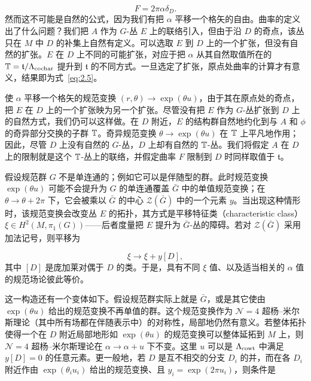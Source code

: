 \setcounter{equation}{4}
\begin{equation}\label{eq:2.5}
  F=2\pi\alpha \delta_D.
\end{equation}
 然而这不可能是自然的公式，因为我们有把 $\alpha$ 平移一个格矢的自由。曲率的定义出了什么问题？我们把 $A$ 作为 $G$-丛 $E$ 上的联络引入，但由于沿 $D$ 的奇点，该丛只在 $M$ 中 $D$ 的补集上自然有定义。可以选取 $E$ 到 $D$ 上的一个扩张，但没有自然的扩张。$E$ 在 $D$ 上不同的可能扩张，对应于把 $\alpha$ 从其自然取值所在的 ${\mathbb{T}}={\mathfrak t}/\Lambda_{\rm cochar}$ 提升到 $\mathfrak t$ 的不同方式。一旦选定了扩张，原点处曲率的计算才有意义，结果即为式~\eqref{eq:2.5}。

使 $\alpha$ 平移一个格矢的规范变换 $(r,\theta)\to \exp(\theta u)$，由于其在原点处的奇点，把 $E$ 在 $D$ 上的一个扩张映为另一个扩张。尽管没有把 $E$ 作为 $G$-丛扩张到 $D$ 上的自然方式，我们仍可以这样做。在 $D$ 附近，$E$ 的结构群自然地约化到与 $A$ 和 $\phi$ 的奇异部分交换的子群 ${\mathbb{T}}$。奇异规范变换 $\theta\to \exp(\theta u)$ 在 ${\mathbb{T}}$ 上平凡地作用；因此，尽管 $D$ 上没有自然的 $G$-丛，$D$ 上却有自然的 ${\mathbb{T}}$-丛。我们将假定 $A$ 在 $D$ 上的限制就是这个 ${\mathbb{T}}$-丛上的联络，并假定曲率 $F$ 限制到 $D$ 时同样取值于 $\mathfrak t$。

假设规范群 $G$ 不是单连通的；例如它可以是伴随型的群。此时规范变换 $\exp(\theta u)$ 可能不会提升为 $G$ 的单连通覆盖 $\bar G$ 中的单值规范变换；在 $\theta\to\theta+2\pi$ 下，它会被乘以 $\bar G$ 的中心 ${\mathcal Z}(\bar G)$ 中的一个元素 $y$。当出现这种情形时，该规范变换会改变丛 $E$ 的拓扑，其方式是平移特征类（characteristic class）$\xi\in H^2(M,\pi_1(G))$——后者度量把 $E$ 提升为 $\bar G$-丛的障碍。若对 ${\mathcal Z}(\bar G)$ 采用加法记号，则平移为

\setcounter{equation}{5}
\begin{equation}\label{eq:2.6}
  \xi\to \xi+y[D],
\end{equation}
 其中 $[D]$ 是庞加莱对偶于 $D$ 的类。于是，具有不同 $\xi$ 值、以及适当相关的 $\alpha$ 值的规范场论彼此等价。

这一构造还有一个变体如下。假设规范群实际上就是 $\bar G$，或是其它使由 $\exp(\theta u)$ 给出的规范变换不再单值的群。这个规范变换作为 $\mathcal N=4$ 超杨–米尔斯理论（其中所有场都在伴随表示中）的对称性，局部地仍然有意义。若整体拓扑使得一个在 $D$ 附近局部地形如 $\exp(\theta u)$ 的规范变换可以整体延拓到 $M$ 上，则 $\mathcal N=4$ 超杨–米尔斯理论在 $\alpha\to\alpha+u$ 下不变。这里 $u$ 可以是 $\Lambda_{\rm cowt}$ 中满足 $y[D]=0$ 的任意元素。更一般地，若 $D$ 是互不相交的分支 $D_i$ 的并，而在各 $D_i$ 附近作由 $\exp(\theta_i u_i)$ 给出的规范变换、且 $y_i=\exp(2\pi u_i)$，则条件是

